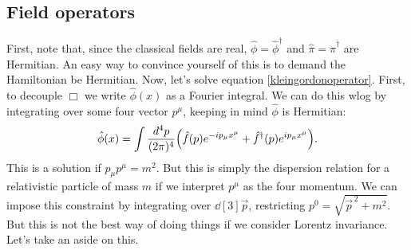 \documentclass{article}
\begin{document}
\subsection{Field operators}
First, note that, since the classical fields are real, $ \hat{\phi} = \hat{\phi}^{\dagger} $ and $ \hat{\pi} = \hat{\pi}^{\dagger} $ are Hermitian. An easy way to convince yourself of this is to demand the Hamiltonian be Hermitian. Now, let's solve equation \eqref{kleingordonoperator}. First, to decouple $ \Box $ we write $ \hat{\phi}(x) $ as a Fourier integral. We can do this wlog by integrating over some four vector $ p^{\mu} $, keeping in mind $ \hat{\phi} $ is Hermitian:
\begin{equation} \label{phifourier}
	\hat{\phi}(x) = \int \frac{\dd[4]{p}}{(2\pi)^{4}} \qty( \hat{f}(p) e^{-ip_{\mu} x^{\mu}} + \hat{f}^{\dagger}(p) e^{ip_{\mu} x^{\mu}} ).
\end{equation}
This is a solution if $ p_{\mu}p^{\mu} = m^{2} $. But this is simply the dispersion relation for a relativistic particle of mass $ m $ if we interpret $ p^{\mu} $ as the four momentum. We can impose this constraint by integrating over $ \dd[3]{\vec{p}} $, restricting $ p^{0} = \sqrt{\vec{p}^{\,2} + m^{2}} $. But this is not the best way of doing things if we consider Lorentz invariance. Let's take an aside on this.
\end{document}
